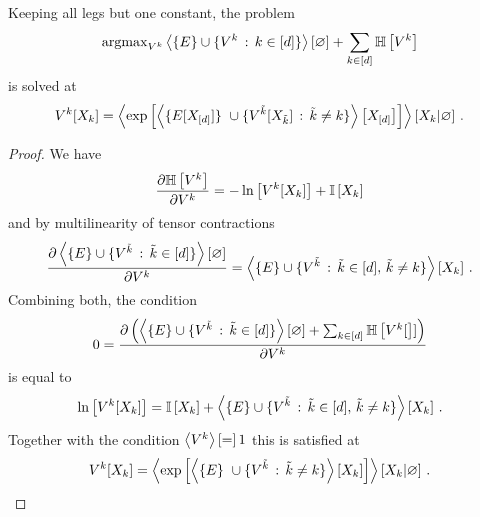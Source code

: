 \begin{theorem}
	Keeping all legs but one constant, the problem
	\begin{align*}
		\mathrm{argmax}_{V^{k}} \left\langle \{E\} \cup \{V^{k} \, : \, k\in[d]\}\right\rangle \left[ \varnothing \right]
		+ \sum_{k\in[d]} \mathbb{H}\left[V^{k}\right] 
	\end{align*}
	is solved at 
		\[ \legcoreofat{\catenumerator}{\catvariableof{\catenumerator}} 
			= \normationof{ \expof{ \contractionof{ \{\energytensor[\shortcatvariables] \} \cup
				\{\legcoreofat{\seccatenumerator}{\catvariableof{\seccatenumerator}} \, : \, \seccatenumerator\neq\catenumerator\} }{\shortcatvariables} }
			}{\catvariableof{\catenumerator}} \, . \]
\end{theorem}
\begin{proof}
	We have
	\begin{align*}
		 \frac{\partial \mathbb{H}\left[V^{k}\right]}{\partial V^{k}}
		=  - \ln \left[ V^{k}[X_{k}] \right]
		+ \mathbb{I}\left[X_{k}\right]
	\end{align*}
	and by multilinearity of tensor contractions
	\begin{align*}
		\frac{\partial \left\langle \{E\}\cup\{V^{\tilde{k}} \, : \, \tilde{k}\in[d] \}\right\rangle \left[ \varnothing \right]}{\partial V^{k}}
		=  \left\langle \{E\}\cup\{V^{\tilde{k}} \, : \, \tilde{k}\in[d] ,\, \tilde{k}\neq k \}\right\rangle \left[ X_{k} \right] \, . 
	\end{align*}
	Combining both, the condition
	\begin{align*}
		0 = \frac{\partial 
			\left( \left\langle \{E\}\cup\{V^{\tilde{k}} \, : \, \tilde{k}\in[d] \}\right\rangle \left[ \varnothing \right] + \sum_{k\in[d]} \mathbb{H}\left[V^{k}[\right]] \right)
		}{\partial V^{k}}
	\end{align*}
	is equal to
	\begin{align*}
		\ln \left[ V^{k}[X_{k}] \right] =
		 \mathbb{I}\left[X_{k}\right] + \left\langle \{E\}\cup\{V^{\tilde{k}} \, : \, \tilde{k}\in[d] ,\, \tilde{k}\neq k \}\right\rangle \left[ X_{k} \right] \, .
	\end{align*}
	Together with the condition $\left\langle V^{k}\right\rangle \left[ = \right]1$ this is satisfied at
		\[ \legcoreofat{\catenumerator}{\catvariableof{\catenumerator}} 
			= \normationof{ \expof{ \contractionof{ \{\energytensor\} \cup
				\{\legcoreof{\seccatenumerator} \, : \, \seccatenumerator\neq\catenumerator\} }{\catvariableof{\catenumerator}} }
			}{\catvariableof{\catenumerator}} \, . \]
\end{proof}



